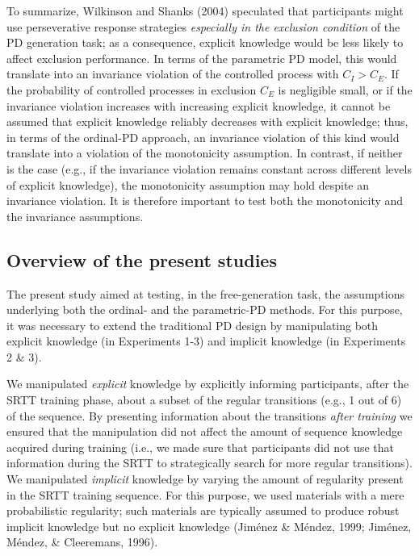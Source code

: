 \documentclass[floatsintext,doc]{apa6}
\theoremstyle{definition}
\theoremstyle{definition}
\theoremstyle{definition}
\theoremstyle{remark}
\begin{document}
To summarize, Wilkinson and Shanks (2004) speculated that participants
might use perseverative response strategies \emph{especially in the
exclusion condition} of the PD generation task; as a consequence,
explicit knowledge would be less likely to affect exclusion performance.
In terms of the parametric PD model, this would translate into an
invariance violation of the controlled process with \(C_I > C_E\). If
the probability of controlled processes in exclusion \(C_E\) is
negligible small, or if the invariance violation increases with
increasing explicit knowledge, it cannot be assumed that explicit
knowledge reliably decreases with explicit knowledge; thus, in terms of
the ordinal-PD approach, an invariance violation of this kind would
translate into a violation of the monotonicity assumption. In contrast,
if neither is the case (e.g., if the invariance violation remains
constant across different levels of explicit knowledge), the
monotonicity assumption may hold despite an invariance violation. It is
therefore important to test both the monotonicity and the invariance
assumptions.

\subsection{Overview of the present
studies}\label{overview-of-the-present-studies}

The present study aimed at testing, in the free-generation task, the
assumptions underlying both the ordinal- and the parametric-PD methods.
For this purpose, it was necessary to extend the traditional PD design
by manipulating both explicit knowledge (in Experiments 1-3) and
implicit knowledge (in Experiments 2 \& 3).

We manipulated \emph{explicit} knowledge by explicitly informing
participants, after the SRTT training phase, about a subset of the
regular transitions (e.g., 1 out of 6) of the sequence. By presenting
information about the transitions \emph{after training} we ensured that
the manipulation did not affect the amount of sequence knowledge
acquired during training (i.e., we made sure that participants did not
use that information during the SRTT to strategically search for more
regular transitions). We manipulated \emph{implicit} knowledge by
varying the amount of regularity present in the SRTT training sequence.
For this purpose, we used materials with a mere probabilistic
regularity; such materials are typically assumed to produce robust
implicit knowledge but no explicit knowledge (Jiménez \& Méndez, 1999;
Jiménez, Méndez, \& Cleeremans, 1996).
\end{document}
